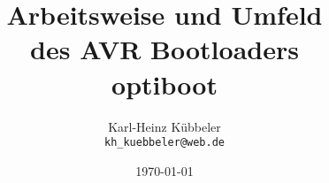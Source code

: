 \documentclass[pdftex,12pt,a4paper,oneside,english]{report}
\begin{document}
\title{Arbeitsweise und Umfeld\\
des AVR Bootloaders \\
 optiboot\\
}
\author{Karl-Heinz Kübbeler\\
\texttt{kh\_kuebbeler@web.de}}
\date{\today}

\maketitle
\tableofcontents












\end{document}
